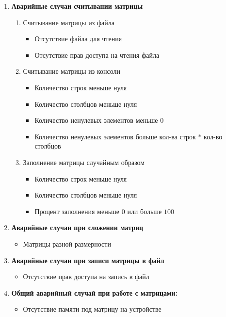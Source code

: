\begin{enumerate}
		\item\textbf{Аварийные случаи считывании матрицы}
		\begin{enumerate}
			\item Считывание матрицы из файла
			\begin{itemize}
				\item Отсутствие файла для чтения
				\item Отсутствие прав доступа на чтения файла
			\end{itemize}
			\item Считывание матрицы из консоли
			\begin{itemize}
				\item Количество строк меньше нуля
				\item Количество столбцов меньше нуля
				\item Количество ненулевых элементов меньше $0$
				\item Количество ненулевых элементов больше кол-ва строк $*$ кол-во столбцов
			\end{itemize}
			\item Заполнение матрицы случайным образом
			\begin{itemize}
				\item Количество строк меньше нуля
				\item Количество столбцов меньше нуля
				\item Процент заполнения меньше $0$ или больше $100$
			\end{itemize}
		\end{enumerate}
		\item\textbf{Аварийные случаи при сложении матриц}
		\begin{itemize}
			\item Матрицы разной размерности
		\end{itemize}
		\item\textbf{Аварийные случаи при записи матрицы в файл}
		\begin{itemize}
			\item Отсутствие прав доступа на запись в файл
		\end{itemize}
		\item\textbf{Общий аварийный случай при работе с матрицами:}
		\begin{itemize}
			\item Отсутствие памяти под матрицу на устройстве
		\end{itemize}
	\end{enumerate}